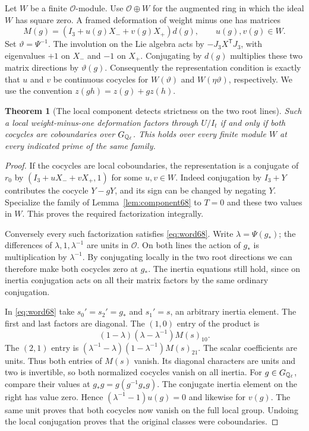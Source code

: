 \documentclass[a4paper,11pt]{article}
\newtheorem{theorem}[proposition]{Theorem}
\theoremstyle{definition}
\theoremstyle{remark}
\numberwithin{equation}{section}
\newcommand{\OO}{\mathcal O}
\begin{document}
Let \(W\) be a finite \(\OO\)-module. Use \(\OO\oplus W\) for
the augmented ring in which the ideal \(W\) has square zero.
A framed deformation of weight minus one has matrices
\[
 M(g)=(I_3+u(g)X_-+v(g)X_+)d(g),\qquad u(g),v(g)\in W .
\]
Set \(\vartheta=\Psi^{-1}\). The involution on the Lie algebra
acts by \(-J_3 X^{\mathsf T}J_3\), with eigenvalues \(+1\)
on \(X_-\) and \(-1\) on \(X_+\). Conjugating by \(d(g)\)
multiplies these two matrix directions by \(\vartheta(g)\).
Consequently the representation condition is exactly that
\(u\) and \(v\) be continuous cocycles for \(W(\vartheta)\)
and \(W(\eta\vartheta)\), respectively. We use the convention
\(z(gh)=z(g)+g z(h)\).

\begin{theorem}[The local component detects strictness on the two root lines]\label{thm:word68}
Such a local weight-minus-one deformation factors through
\(U/I_t\) if and only if both cocycles are coboundaries over
\(G_{\mathbb Q_\ell}\). This holds over every finite module \(W\)
at every indicated prime of the same family.
\end{theorem}
\begin{proof}
If the cocycles are local coboundaries, the representation is a
conjugate of \(r_0\) by \((I_3+uX_-+vX_+,1)\) for some
\(u,v\in W\). Indeed conjugation by \(I_3+Y\) contributes the
cocycle \(Y-gY\), and its sign can be changed by negating \(Y\).
Specialize the family of Lemma~\ref{lem:component68} to
\(T=0\) and these two values in \(W\). This proves the required
factorization integrally.

Conversely every such factorization satisfies \eqref{eq:word68}.
Write \(\lambda=\Psi(g_*)\); the differences of
\(\lambda,1,\lambda^{-1}\) are units in \(\OO\).
On both lines the action of \(g_*\) is multiplication by
\(\lambda^{-1}\). By conjugating locally in the two root
directions we can therefore make both cocycles zero at \(g_*\).
The inertia equations still hold, since on inertia conjugation
acts on all their matrix factors by the same ordinary conjugation.

In \eqref{eq:word68} take \(s_0'=s_2'=g_*\) and
\(s_1'=s\), an arbitrary inertia element. The first and last
factors are diagonal. The \((1,0)\) entry of the product is
\[
          (1-\lambda)(\lambda-\lambda^{-1})M(s)_{10}.
\]
The \((2,1)\) entry is
\((\lambda^{-1}-\lambda)(1-\lambda^{-1})M(s)_{21}\).
The scalar coefficients are units. Thus both entries of \(M(s)\)
vanish. Its diagonal characters are units and two is invertible,
so both normalized cocycles vanish on all inertia. For
\(g\in G_{\mathbb Q_\ell}\), compare their values at
\(g_*g=g(g^{-1}g_*g)\). The conjugate inertia element on the
right has value zero. Hence \((\lambda^{-1}-1)u(g)=0\)
and likewise for \(v(g)\). The same unit proves that both
cocycles now vanish on the full local group. Undoing the local
conjugation proves that the original classes were coboundaries.
\end{proof}
\end{document}
